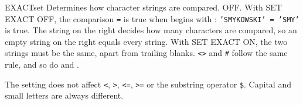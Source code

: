 \begin{XbaseEntry}{EXACT}{set}
Determines how character strings are compared.
\Syntax
{}
\Defaults
OFF.
\Usage
With SET EXACT OFF, the comparison  \texttt{=}  is true
when  begins with : \texttt{'SMYKOWSKI' = 'SMY'} is true.
The string on the right decides how many characters are compared, so an empty
string on the right equals every string.  With SET EXACT ON, the two strings
must be the same, apart from trailing blanks.  \texttt{<>} and \texttt{\#}
follow the same rule, and so do  and .

The setting does not affect \texttt{<}, \texttt{>}, \texttt{<=}, \texttt{>=} or
the substring operator \texttt{\$}.  Capital and small letters are always
different.
\Examples
{}
\end{XbaseEntry}

